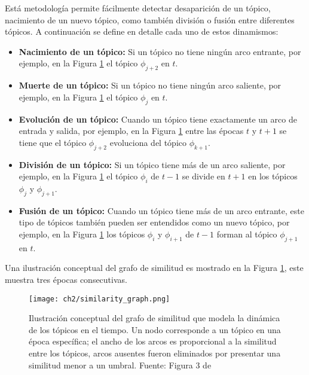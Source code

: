 \documentclass[letterpaper,12pt,oneside]{book} %
\begin{document}
Está metodología permite fácilmente detectar desaparición de un tópico, nacimiento de un nuevo tópico, como también división o fusión entre diferentes tópicos. A continuación se define en detalle cada uno de estos dinamismos:

\begin{itemize}
    \item \textbf{Nacimiento de un tópico:} Si un tópico no tiene ningún arco entrante, por ejemplo, en la Figura \ref{img:graph} el tópico $\phi_{j+2}$ en $t$.
    \item \textbf{Muerte de un tópico:} Si un tópico no tiene ningún arco saliente, por ejemplo, en la Figura \ref{img:graph} el tópico $\phi_{j}$ en $t$.
    \item \textbf{Evolución de un tópico:} Cuando un tópico tiene exactamente un arco de entrada y salida, por ejemplo, en la Figura \ref{img:graph} entre las épocas $t$ y $t+1$ se tiene que el tópico $\phi_{j+2}$ evoluciona del tópico $\phi_{k+1}$.
    \item \textbf{División de un tópico:} Si un tópico tiene más de un arco saliente, por ejemplo, en la Figura \ref{img:graph} el tópico $\phi_{i}$ de $t-1$ se divide en $t+1$ en los tópicos $\phi_{j}$ y $\phi_{j+1}$.
    \item \textbf{Fusión de un tópico:} Cuando un tópico tiene más de un arco entrante, este tipo de tópicos también pueden ser entendidos como un nuevo tópico, por ejemplo, en la Figura \ref{img:graph} los tópicos $\phi_{i}$ y $\phi_{i+1}$ de $t-1$ forman al tópico $\phi_{j+1}$ en $t$.
\end{itemize}

Una ilustración conceptual del grafo de similitud es mostrado en la Figura \ref{img:graph}, este muestra tres épocas consecutivas.

\begin{figure}
    \centering
    \texttt{[image: ch2/similarity\_graph.png]}
    \caption{Ilustración conceptual del grafo de similitud que modela la dinámica de los tópicos en el tiempo. Un nodo corresponde a un tópico en una época específica; el ancho de los arcos es proporcional a la similitud entre los tópicos, arcos ausentes fueron eliminados por presentar una similitud menor a un umbral. Fuente:  Figura 3 de \citep{beykikhoshk2018discovering}}
    \label{img:graph}
\end{figure}
\end{document}
